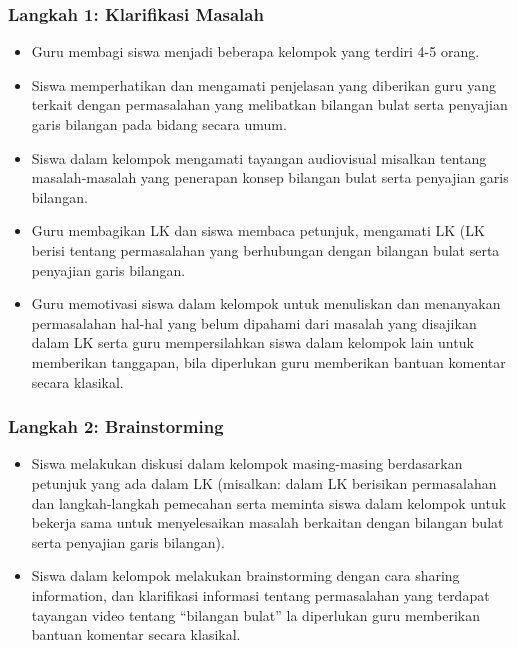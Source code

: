 \documentclass[a5paper,10pt,openany]{book}
\begin{document}
\subsubsection{Langkah 1: Klarifikasi Masalah}
{\color{NavyBlue}
\begin{itemize}[\faCheckSquare,leftmargin=*,itemsep=-4pt,topsep=2pt]	
	\item Guru membagi siswa menjadi beberapa kelompok yang terdiri 4-5 orang.
	\item Siswa memperhatikan dan mengamati penjelasan yang diberikan guru yang terkait dengan permasalahan yang melibatkan bilangan bulat serta penyajian garis bilangan pada bidang secara umum. 
	\item Siswa dalam kelompok mengamati tayangan audiovisual misalkan tentang masalah-masalah yang penerapan konsep bilangan bulat serta penyajian garis bilangan.
	\item Guru membagikan LK dan siswa membaca petunjuk, mengamati LK (LK berisi tentang permasalahan yang berhubungan dengan bilangan bulat serta penyajian garis bilangan.
	\item Guru memotivasi siswa dalam kelompok untuk menuliskan dan menanyakan permasalahan hal-hal yang belum dipahami dari masalah yang disajikan dalam LK serta guru mempersilahkan siswa dalam kelompok lain untuk memberikan tanggapan, bila diperlukan guru memberikan bantuan komentar secara klasikal. 
\end{itemize}	
}
\subsubsection{Langkah 2: Brainstorming}
{\color{NavyBlue}
	\begin{itemize}[\faCheckSquare,leftmargin=*,itemsep=-4pt,topsep=2pt]	
		\item Siswa melakukan diskusi dalam kelompok masing-masing berdasarkan petunjuk yang ada dalam LK (misalkan: dalam LK berisikan permasalahan dan langkah-langkah pemecahan serta meminta siswa dalam kelompok untuk bekerja sama untuk menyelesaikan masalah berkaitan dengan bilangan bulat serta penyajian garis bilangan).
		\item Siswa dalam kelompok melakukan brainstorming dengan cara sharing information, dan klarifikasi informasi tentang permasalahan yang terdapat tayangan video tentang “bilangan bulat”
		la diperlukan guru memberikan bantuan komentar secara klasikal. 
	\end{itemize}	
}	
\end{document}
